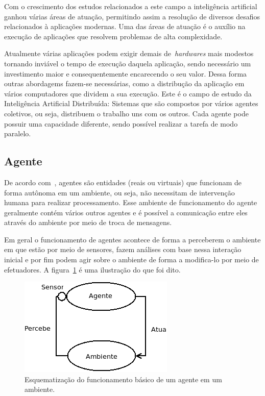 Com o crescimento dos estudos relacionados a este campo a inteligência artificial ganhou várias áreas de atuação, permitindo assim a resolução de diversos desafios relacionados à aplicações modernas. Uma das áreas de atuação é o auxílio na execução de aplicações que resolvem problemas de alta complexidade. 

Atualmente várias aplicações podem exigir demais de~\emph{hardwares} mais modestos tornando inviável o tempo de execução daquela aplicação, sendo necessário um investimento maior e consequentemente encarecendo o seu valor. Dessa forma outras abordagems fazem-se necessárias, como a distribução da aplicação em vários computadores que dividem a sua execução. Este é o campo de estudo da Inteligência Artificial Distribuída: Sistemas que são compostos por vários agentes coletivos, ou seja, distribuem o trabalho uns com os outros. Cada agente pode possuir uma capacidade diferente, sendo possível realizar a tarefa de modo paralelo. 

\subsection{Agente}

De acordo com~\cite{novig95}, agentes são entidades (reais ou virtuais) que funcionam de forma autônoma em um ambiente, ou seja, não necessitam de intervenção humana para realizar processamento. Esse ambiente de funcionamento do agente geralmente contém vários outros agentes e é possível a comunicação entre eles através do ambiente por meio de troca de mensagens.

Em geral o funcionamento de agentes acontece de forma a perceberem o ambiente em que estão por meio de sensores, fazem análises com base nessa interação inicial e por fim podem agir sobre o ambiente de forma a modifica-lo por meio de efetuadores. A figura~\ref{fig:agente-basico} é uma ilustração do que foi dito.

\begin{figure}
	\centering
	\includegraphics[scale=0.75]{images/agente-basico.png}
	\caption{Esquematização do funcionamento básico de um agente em um ambiente.}
	\label{fig:agente-basico}
\end{figure}


